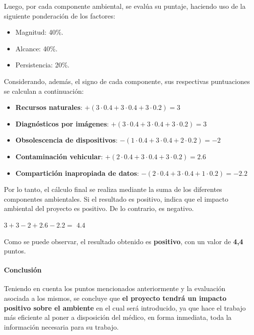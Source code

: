 {\correccionTexto
Luego, por cada componente ambiental, se evalúa su puntaje, haciendo uso de la siguiente ponderación de los factores:

\begin{itemize}
    \item Magnitud: 40\%.
    \item Alcance: 40\%.
    \item Persistencia: 20\%.
\end{itemize}

Considerando, además, el signo de cada componente, sus respectivas puntuaciones se calculan a continuación:

\begin{itemize}
    \item \textbf{Recursos naturales}: $+ (3 \cdot 0.4 + 3 \cdot 0.4 + 3 \cdot 0.2) = 3$
    \item \textbf{Diagnósticos por imágenes}: $+ (3 \cdot 0.4 + 3 \cdot 0.4 + 3 \cdot 0.2) = 3$
    \item \textbf{Obsolescencia de dispositivos}: $- (1 \cdot 0.4 + 3 \cdot 0.4 + 2 \cdot 0.2) = -2$
    \item \textbf{Contaminación vehicular}: $+ (2 \cdot 0.4 + 3 \cdot 0.4 + 3 \cdot 0.2) = 2.6$
    \item \textbf{Compartición inapropiada de datos}: $- (2 \cdot 0.4 + 3 \cdot 0.4 + 1 \cdot 0.2) = -2.2$
\end{itemize}

Por lo tanto, el cálculo final se realiza mediante la suma de los diferentes componentes ambientales.
Si el resultado es positivo, indica que el impacto ambiental del proyecto es positivo.
De lo contrario, es negativo.

$3 + 3 - 2 + 2.6 - 2.2 = $ \textbf{$4.4$}

Como se puede observar, el resultado obtenido es \textbf{positivo}, con un valor de \textbf{4,4} puntos.
}


\paragraph{Conclusión}
{\correccionTexto
	Teniendo en cuenta los puntos mencionados anteriormente y la evaluación asociada a los mismos, se concluye que \textbf{el proyecto tendrá un impacto positivo sobre el ambiente} en el cual será introducido, ya que hace el trabajo más eficiente al poner a disposición del médico, en forma inmediata, toda la información necesaria para su trabajo.
}

